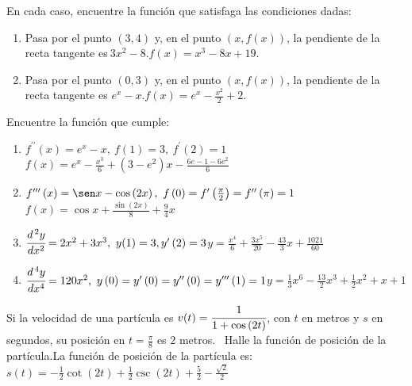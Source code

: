 \begin{ejer}{En cada caso, encuentre la función que satisfaga las condiciones dadas:}
\begin{enumerate}
	
\item {Pasa por el punto $(3,4)$ y, en el punto $(x,f(x))$, la pendiente de la recta tangente es$\ 3x^{2}-8$.}{$f(x)=x^{3}-8x+19$.}

\item {Pasa por el punto $(0,3)$ y, en el punto $(x,f(x))$, la pendiente de la recta tangente es $e^{x}-x$.}{$f(x)=e^{x}-
\frac{x^{2}}{2}+2$.}
\end{enumerate}
\end{ejer}



\begin{ejer}{Encuentre la función que cumple:}
\begin{enumerate}

\item {$f^{\prime\prime}\left( x\right) =e^{x}-x,\ f\left( 1\right) =3,\ f^{\prime}\left( 2\right) =1$}{$f(x)=e^{x}-\frac{x^{3}}{6}
+(3-e^{2})x-\frac{6e-1-6e^{2}}{6}$}

\item {$f^{\prime\prime\prime}\left( x\right) =\sen x-\cos\left( 2x\right),\ f\left( 0\right) =f^{\prime}\left( \frac{\pi }{2}
\right) =f^{\prime\prime}\left( \pi \right) =1$}{$f\left( x\right) =\cos x+\frac{\sin \left( 2x\right) }{8}+\frac{9}{4}x$}

\item {$\cfrac{d^{\,2}y}{dx^{2}}=2x^{2}+3x^{3},\ y(1)=3,y^{\prime}\left(2\right)=3$}{$y=\frac{x^{4}}{6}+\frac{3x^{5}}{20}-\frac{43}{3}x+\frac{1021}{60}$}

\item {$\cfrac{d^{\,4}y}{dx^{4}}=120x^{2},\ y\left( 0\right) =y^{\prime}\left( 0\right) =y^{\prime\prime}\left( 0\right)=y^{\prime\prime\prime}\left( 1\right) =1$}{$ y=\frac{1}{3}x^6 -\frac{13}{2}x^{3}+\frac{1}{2}x^{2}+x+1$}
\end{enumerate}
\end{ejer}


\begin{ejer}{Si la velocidad de una partícula es {\footnotesize $v(t)=\cfrac{1}{1+\cos \left( 2t\right)}$,} con $t$ en metros y $s$ en segundos,
su posición en $t=\frac{\pi }{8}$ es $2$ metros. \ Halle la función de posición de la partícula.La función de posición de la partícula es: $s(t)=-\frac{1}{2}\cot \left( 2t\right) +\frac{1}{2}\csc \left( 2t\right) +%
\frac{5}{2}-\frac{\sqrt{2}}{2}$}
\end{ejer}

